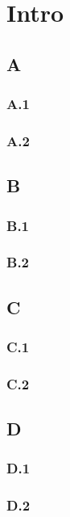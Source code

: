 
\chapter{Intro}  %
\label{chap:intro}

\ifpdf
    \graphicspath{{Chapter1/Figs/Raster/}{Chapter1/Figs/PDF/}{Chapter1/Figs/}}
\else
    \graphicspath{{Chapter1/Figs/Vector/}{Chapter1/Figs/}}
\fi

\section{A}
\subsection{A.1} 
\subsection{A.2} 
\section{B}
\subsection{B.1} 
\subsection{B.2} 
\section{C}
\subsection{C.1} 
\subsection{C.2} 
\section{D}
\subsection{D.1} 
\subsection{D.2} 

